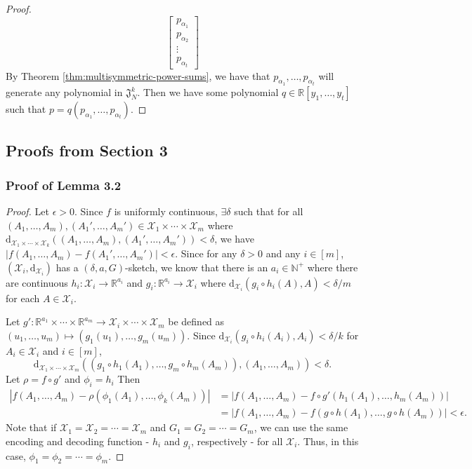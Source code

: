 \documentclass[12pt]{article}
\newcommand{\R}{\mathbb R}
\newcommand{\N}{\mathbb N}
\begin{document}
\begin{proof}
\begin{equation*}
\begin{bmatrix}
            p_{\alpha_1} \\
            p_{\alpha_2} \\
            \vdots \\
            p_{\alpha_t}
        \end{bmatrix}
    \end{equation*}
    By Theorem \ref{thm:multisymmetric-power-sums}, we have that $p_{\alpha_1}, \dots, p_{\alpha_t}$ will generate any polynomial in $\mathfrak{J}_N^k$. Then we have some polynomial $q \in \R[y_1, \dots, y_t]$ such that $p = q(p_{\alpha_1}, \dots, p_{\alpha_t})$. 
\end{proof}

\subsection{Proofs from Section 3}
\label{appendix:section-3-proofs}
\subsubsection{Proof of Lemma 3.2}
\begin{proof}
     Let $\epsilon > 0$. 
     Since $f$ is uniformly continuous, $\exists \delta$ such that for all $(A_1, \dots, A_m), (A_1', \dots,  A_m') \in \mathcal{X}_1 \times \cdots \times \mathcal{X}_m$ where $\mathrm{d}_{\mathcal{X}_1 \times \cdots \times \mathcal{X}_k}((A_1, \dots, A_m), (A_1',\dots, A_m')) < \delta$, we have $|f(A_1, \dots, A_m) - f(A_1', \dots, A_m') | < \epsilon$.
     Since for any $\delta > 0$ and any $i \in [m]$, $(\mathcal{X}_i, \mathrm{d}_{\mathcal{X}_i})$ has a $(\delta, a, G)$-sketch, we know that there is an $a_i \in \N^+$ where there are continuous $h_i: \mathcal{X}_i \to \R^{a_i}$ and $g_i: \R^{a_i} \to \mathcal{X}_i$ where $\mathrm{d}_{\mathcal{X}_i}(g_i \circ h_i(A), A) < \delta/m$ for each $A \in \mathcal{X}_i$.

    Let $g': \R^{a_1} \times \cdots \times \R^{a_m} \to \mathcal{X}_i \times \cdots \times \mathcal{X}_m$ be defined as $(u_1, \dots, u_m) \mapsto (g_1(u_1), \dots, g_m(u_m))$. 
    Since $\mathrm{d}_{\mathcal{X}_i}(g_i \circ h_i(A_i), A_i) < \delta/k$ for $A_i \in \mathcal{X}_i$ and $i \in [m]$, 
    \begin{equation*}
        \mathrm{d}_{\mathcal{X}_1 \times \cdots \times \mathcal{X}_m}((g_1 \circ h_1(A_1), \dots,  g_m\circ h_m(A_m)), (A_1, \dots, A_m)) < \delta.
    \end{equation*}
    Let $\rho = f \circ g'$ and $\phi_i = h_i$ Then 
    \begin{align*}
        |f(A_1, \dots, A_m) - \rho(\phi_1(A_1), \dots, \phi_k(A_m))| &= |f(A_1, \dots, A_m) - f \circ g'(h_1(A_1), \dots, h_m(A_m))| \\
        &= |f(A_1, \dots, A_m) - f(g \circ h(A_1),\dots, g \circ h(A_m))| < \epsilon.
    \end{align*}
    Note that if $\mathcal{X}_1 = \mathcal{X}_2 = \cdots = \mathcal{X}_m$ and $G_1 = G_2 = \cdots = G_m$, we can use the same encoding and decoding function - $h_i$ and $g_i$, respectively - for all $\mathcal{X}_i$. 
    Thus, in this case, $\phi_1 = \phi_2 = \cdots = \phi_m$.
\end{proof}
\end{document}
